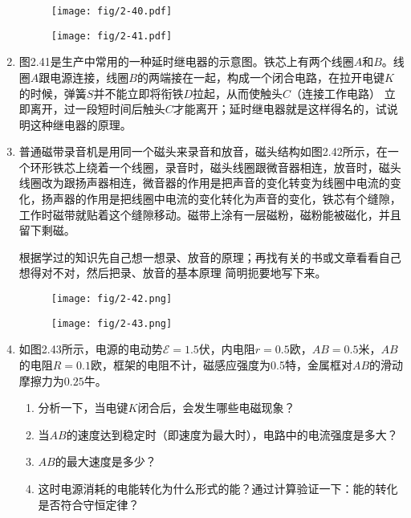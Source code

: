 \begin{enumerate}
\begin{figure}[htp]
\centering
\begin{minipage}[t]{0.48\textwidth}
\centering
\texttt{[image: fig/2-40.pdf]}
\caption{}
\end{minipage}
\begin{minipage}[t]{0.48\textwidth}
\centering
\texttt{[image: fig/2-41.pdf]}
\caption{}
\end{minipage}
\end{figure}

\item 图2.41是生产中常用的一种延时继电器的示意图。铁芯上有两个线圈$A$和$B$。线圈$A$跟电源连接，线圈$B$的两端接在一起，构成一个闭合电路，在拉开电键$K$的时候，弹簧$S$并不能立即将衔铁$D$拉起，从而使触头$C$（连接工作电路）
立即离开，过一段短时间后触头$C$才能离开；延时继电器就是这样得名的，试说明这种继电器的原理。
\item 普通磁带录音机是用同一个磁头来录音和放音，磁头结构如图2.42所示，在一个环形铁芯上绕着一个线圈，录音时，磁头线圈跟微音器相连，放音时，磁头线圈改为跟扬声器相连，微音器的作用是把声音的变化转变为线圈中电流的变化，扬声器的作用是把线圈中电流的变化转化为声音的变化，铁芯有个缝隙，工作时磁带就贴着这个缝隙移动。磁带上涂有一层磁粉，磁粉能被磁化，并且留下剩磁。

根据学过的知识先自己想一想录、放音的原理；再找有关的书或文章看看自己想得对不对，然后把录、放音的基本原理
简明扼要地写下来。
\begin{figure}[htp]
\centering
\begin{minipage}[t]{0.48\textwidth}
\centering
\texttt{[image: fig/2-42.png]}
\caption{}
\end{minipage}
\begin{minipage}[t]{0.48\textwidth}
\centering
\texttt{[image: fig/2-43.png]}
\caption{}
\end{minipage}
\end{figure}

\item 如图2.43所示，电源的电动势$\mathcal{E}=1.5$伏，内电阻$r=0.5$欧，$AB=0.5$米，$AB$的电阻$R=0.1$欧，框架的电阻不计，磁感应强度为0.5特，金属框对$AB$的滑动摩擦力为$0.25$牛。
\begin{enumerate}
    \item 分析一下，当电键$K$闭合后，会发生哪些电磁现象？
    \item 当$AB$的速度达到稳定时（即速度为最大时），电路中的电流强度是多大？
    \item $AB$的最大速度是多少？
    \item 这时电源消耗的电能转化为什么形式的能？通过计算验证一下：能的转化是否符合守恒定律？
\end{enumerate}


\end{enumerate}




















